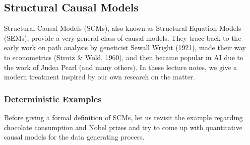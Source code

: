 \subsection{Structural Causal Models}

Structural Causal Models (SCMs), also known as Structural Equation Models (SEMs), provide a very
general class of causal models. They trace back to the early work on path analysis by geneticist
Sewall Wright (1921), made their
way to econometrics (Strotz \& Wold, 1960), and then became popular in AI due to the work of Judea Pearl (and many others).
In these lecture notes, we give a modern treatment inspired by our own research on the matter.

\subsubsection{Deterministic Examples}\label{sec:deterministic_scms}

Before giving a formal definition of SCMs, let us revisit the example regarding chocolate consumption and Nobel prizes
and try to come up with quantitative causal models for the data generating process.

